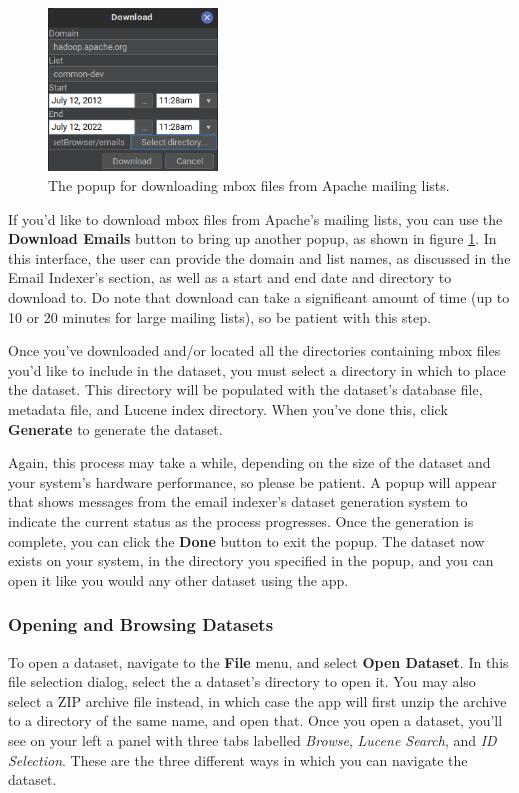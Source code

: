 \documentclass[a4paper, 12pt]{article}
\begin{document}
			\begin{figure}
				\includegraphics[width=0.4\textwidth]{img/edb-app_download-popup.png}
				\caption{The popup for downloading mbox files from Apache mailing lists.}
				\label{fig:edb-app-download-emails}
			\end{figure}
		
			If you'd like to download mbox files from Apache's mailing lists, you can use the \textbf{Download Emails} button to bring up another popup, as shown in figure \ref{fig:edb-app-download-emails}. In this interface, the user can provide the domain and list names, as discussed in the Email Indexer's section, as well as a start and end date and directory to download to. Do note that download can take a significant amount of time (up to 10 or 20 minutes for large mailing lists), so be patient with this step.
			
			Once you've downloaded and/or located all the directories containing mbox files you'd like to include in the dataset, you must select a directory in which to place the dataset. This directory will be populated with the dataset's database file, metadata file, and Lucene index directory. When you've done this, click \textbf{Generate} to generate the dataset.
			
			Again, this process may take a while, depending on the size of the dataset and your system's hardware performance, so please be patient. A popup will appear that shows messages from the email indexer's dataset generation system to indicate the current status as the process progresses. Once the generation is complete, you can click the \textbf{Done} button to exit the popup. The dataset now exists on your system, in the directory you specified in the popup, and you can open it like you would any other dataset using the app.
			
		\newpage
		\subsubsection{Opening and Browsing Datasets}
			To open a dataset, navigate to the \textbf{File} menu, and select \textbf{Open Dataset}. In this file selection dialog, select the a dataset's directory to open it. You may also select a ZIP archive file instead, in which case the app will first unzip the archive to a directory of the same name, and open that. Once you open a dataset, you'll see on your left a panel with three tabs labelled \textit{Browse}, \textit{Lucene Search}, and \textit{ID Selection}. These are the three different ways in which you can navigate the dataset.
			
\end{document}
